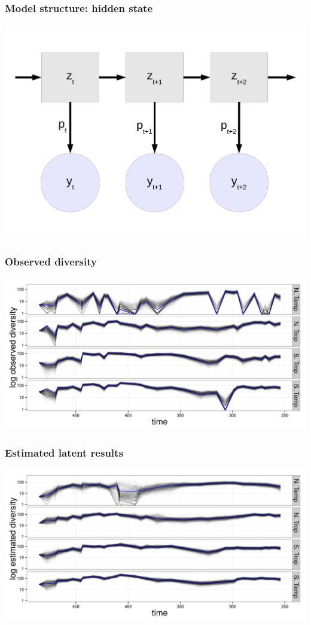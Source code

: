 \documentclass{beamer}
\begin{document}
\begin{frame}
  \frametitle{Model structure: hidden state}
  \begin{center}
    \includegraphics[width=\textwidth,height=0.8\textheight,keepaspectratio=true]{figure/hidden_state}
  \end{center}
\end{frame}

\begin{frame}
  \frametitle{Observed diversity}
  \begin{center}
    \includegraphics[width=\textwidth,height=0.8\textheight,keepaspectratio=true]{figure/obs_div}
  \end{center}
\end{frame}

\begin{frame}
  \frametitle{Estimated latent results}
  \begin{center}
    \includegraphics[width=\textwidth,height=0.8\textheight,keepaspectratio=true]{figure/true_div}
  \end{center}
\end{frame}
\end{document}
